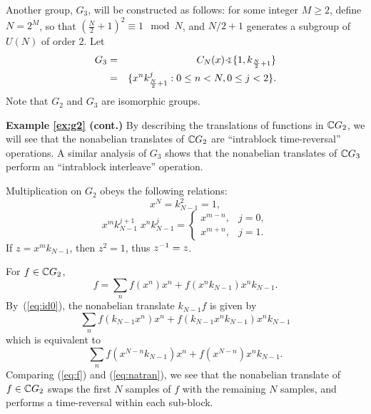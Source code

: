 \begin{example}\label{ex:g3}
Another group, $G_3$, will be constructed as follows: for some 
integer $M \geq 2$, define $N= 2^M$, so that
$\left(\frac{N}{2} + 1\right)^2 \equiv 1 \mod N$,
and $N/2 + 1$ generates a subgroup of $U(N)$ of order 2.
Let 
\begin{eqnarray*}
G_3 &=& C_N(x) \sdp \{1, k_{\frac{N}{2} + 1}\}\\
& =& \{x^n k_{\frac{N}{2}+1}^j : 0 \leq n < N, 0 \leq j < 2\}.
\end{eqnarray*}
Note that $G_2$ and $G_3$ are isomorphic groups.
\end{example}

{\bf Example {\ref{ex:g2}} (cont.)}  
By describing the translations of functions in $\mathbb{C} G_2$,  
we will see that the nonabelian translates of
$\mathbb{C} G_2$ are ``intrablock time-reversal'' operations.
A similar analysis of $G_3$ shows that the nonabelian 
translates of $\mathbb{C} G_3$ perform an ``intrablock interleave''
operation. 

Multiplication on $G_2$ obeys the following relations:
\begin{equation}\label{eq:id0}
  x^N = k_{N-1}^2 = 1,
\end{equation}
\begin{equation}
  x^mk_{N-1}^{j+1} \; x^nk_{N-1}^j = 
  \begin{cases} 
    x^{m-n}, & j=0,\\
    x^{m+n}, & j=1.
  \end{cases}
\end{equation}
If $z=x^mk_{N-1}$, then $z^2=1$, thus $z^{-1}=z$.

For $f\in \mathbb{C} G_2$, 
\begin{equation}\label{eq:f}
  f = \sum_n f(x^n)x^n + f(x^n k_{N-1})x^n k_{N-1}.
\end{equation}
By~(\ref{eq:id0}), the nonabelian translate $k_{N-1}f$
is given by
\[
\sum_n f(k_{N-1}x^n)x^n + f(k_{N-1}x^n k_{N-1})x^n k_{N-1}
\]
which is equivalent to 
\begin{equation}\label{eq:natran}
\sum_n f(x^{N-n} k_{N-1})x^n + f(x^{N-n}) x^n k_{N-1}.
\end{equation}
Comparing (\ref{eq:f}) and (\ref{eq:natran}), we see that
the nonabelian translate of $f\in \mathbb{C} G_2$ swaps the first $N$
samples of $f$ with the remaining $N$ samples, and performs
a time-reversal within each sub-block.


